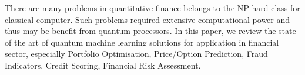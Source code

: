 There are many problems in quantitative finance belongs to the NP-hard class for classical computer.
Such problems required extensive computational power and thus may be benefit from quantum processors.
In this paper, we review the state of the art of quantum machine learning solutions for application in financial sector, especially Portfolio Optimisation, Price/Option Prediction, Fraud Indicators, Credit Scoring, Financial Risk Assessment.

